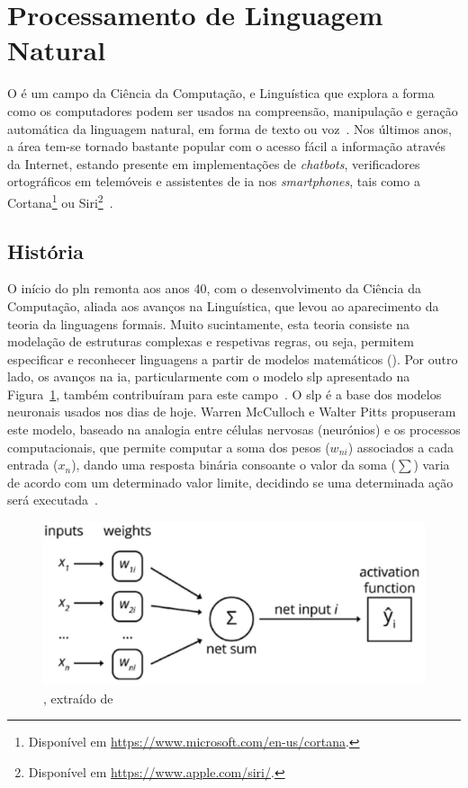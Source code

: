 \section{Processamento de Linguagem Natural}
\label{sec:chap03_pln}
O  é um campo da Ciência da Computação,  e Linguística que explora a forma como os computadores podem ser usados na compreensão, manipulação e geração automática da linguagem natural, em forma de texto ou voz~\parencite{nlp, applied_natural_language_processing_with_python, pln_extracao_conhecimento}. Nos últimos anos, a área tem-se tornado bastante popular com o acesso fácil a informação através da Internet, estando presente em implementações de \textit{chatbots}, verificadores ortográficos em telemóveis e assistentes de \gls{ia} nos \textit{smartphones}, tais como a Cortana\footnote{Disponível em \url{https://www.microsoft.com/en-us/cortana}.} ou Siri\footnote{Disponível em \url{https://www.apple.com/siri/}.}~\parencite{pln_extracao_conhecimento, applied_natural_language_processing_with_python}. 

\subsection{História}
O início do \gls{pln} remonta aos anos 40, com o desenvolvimento da Ciência da Computação, aliada aos avanços na Linguística, que levou ao aparecimento da teoria da linguagens formais. Muito sucintamente, esta teoria consiste na modelação de estruturas complexas e respetivas regras, ou seja, permitem especificar e reconhecer linguagens a partir de modelos matemáticos (). Por outro lado, os avanços na \gls{ia}, particularmente com o modelo \gls{slp} apresentado na Figura~\ref{fig:slp}, também contribuíram para este campo~\parencite{applied_natural_language_processing_with_python}. O \gls{slp} é a base dos modelos neuronais usados nos dias de hoje. Warren McCulloch e Walter Pitts propuseram este modelo, baseado na analogia entre células nervosas (neurónios) e os processos computacionais, que permite computar a soma dos pesos ($w_{ni}$) associados a cada entrada ($x_{n}$), dando uma resposta binária consoante o valor da soma ($\sum$) varia de acordo com um determinado valor limite, decidindo se uma determinada ação será executada~\parencite{introduction_theory_neural_computation}.

\begin{figure}[!t]
    \centering
    \includegraphics[width=.8\textwidth]{ch03/assets/slp_model.jpg}
    \caption{, extraído de~\textcite{applied_natural_language_processing_with_python}}
    \label{fig:slp}
\end{figure}

